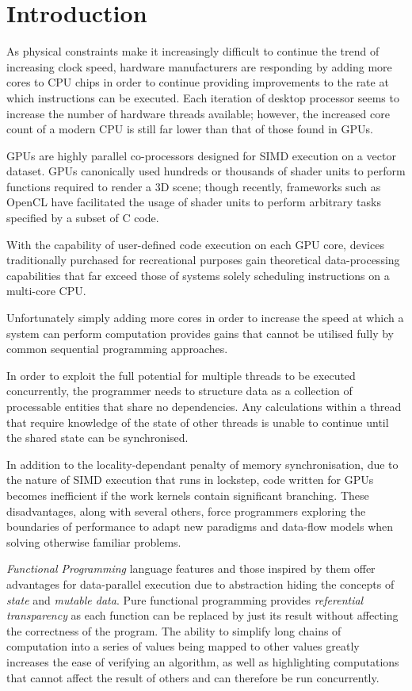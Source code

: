 \section{Introduction}
  As physical constraints make it increasingly difficult to continue the trend of increasing clock speed, hardware manufacturers are responding by adding more cores to \ac{CPU} chips in order to continue providing improvements to the rate at which instructions can be executed. \cite{perf}
  Each iteration of desktop processor seems to increase the number of hardware threads available; however, the increased core count of a modern \ac{CPU} is still far lower than that of those found in \ac{GPUs}.

\ac{GPUs} are highly parallel co-processors designed for \ac{SIMD} execution on a vector dataset.
\ac{GPUs} canonically used hundreds or thousands of shader units to perform functions required to render a 3D scene; though recently, frameworks such as \ac{OpenCL} have facilitated the usage of shader units to perform arbitrary tasks specified by a subset of C code.

 With the capability of user-defined code execution on each GPU core, devices traditionally purchased for recreational purposes gain theoretical data-processing capabilities that far exceed those of systems solely scheduling instructions on a multi-core \ac{CPU}.

Unfortunately simply adding more cores in order to increase the speed at which a system can perform computation provides gains that cannot be utilised fully by common sequential programming approaches.

In order to exploit the full potential for multiple threads to be executed concurrently, the programmer needs to structure data as a collection of processable entities that share no dependencies.
Any calculations within a thread that require knowledge of the state of other threads is unable to continue until the shared state can be synchronised.

In addition to the locality-dependant penalty of memory synchronisation, due to the nature of \ac{SIMD} execution that runs in lockstep, code written for \ac{GPUs} becomes inefficient if the work kernels contain significant branching.
These disadvantages, along with several others, force programmers exploring the boundaries of performance to adapt new paradigms and data-flow models when solving otherwise familiar problems.


\emph{Functional Programming} language features and those inspired by them offer advantages for data-parallel execution due to abstraction hiding the concepts of \emph{state} and \emph{mutable data}.
Pure functional programming provides \emph{referential transparency} as each function can be replaced by just its result without affecting the correctness of the program.
The ability to simplify long chains of computation into a series of values being mapped to other values greatly increases the ease of verifying an algorithm, as well as highlighting computations that cannot affect the result of others and can therefore be run concurrently.

